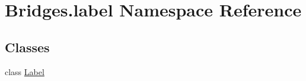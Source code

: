 \hypertarget{namespace_bridges_1_1label}{}\section{Bridges.\+label Namespace Reference}
\label{namespace_bridges_1_1label}
\subsection*{Classes}
\begin{DoxyCompactItemize}
\item 
class \mbox{\hyperlink{class_bridges_1_1label_1_1_label}{Label}}
\end{DoxyCompactItemize}
